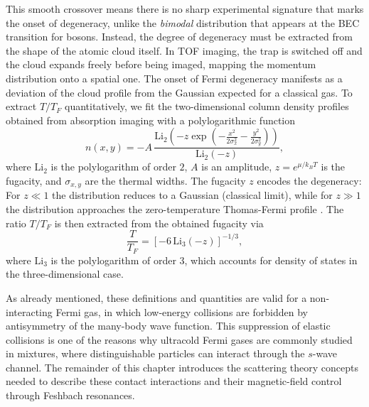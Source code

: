 This smooth crossover means there is no sharp experimental signature that marks the onset of degeneracy, unlike the \textit{bimodal} distribution that appears at the \ac{BEC} transition for bosons. Instead, the degree of degeneracy must be extracted from the shape of the atomic cloud itself. In \ac{TOF} imaging, the trap is switched off and the cloud expands freely before being imaged, mapping the momentum distribution onto a spatial one. The onset of Fermi degeneracy manifests as a deviation of the cloud profile from the Gaussian expected for a classical gas. To extract $T/T_F$ quantitatively, we fit the two-dimensional column density profiles obtained from absorption imaging with a polylogarithmic function \cite{Ketterle2008mpa, Demarco2001qbo}
\begin{equation}
	n(x,y) = -A\,\frac{\mathrm{Li}_2\left(-z \exp\left(-\frac{x^2}{2\sigma_x^2} - \frac{y^2}{2\sigma_y^2}\right)\right)}{\mathrm{Li}_2\left(-z\right)},
	\label{eq:PolyLog}
\end{equation} 
where $ \mathrm{Li}_2$ is the polylogarithm of order $2$, $A$ is an amplitude, $z=e^{\mu/k_BT}$ is the fugacity, and $\sigma_{x,y}$ are the thermal widths. The fugacity $z$ encodes the degeneracy: For $z\ll 1$ the distribution reduces to a Gaussian (classical limit), while for $z\gg1$ the distribution approaches the zero-temperature Thomas-Fermi profile \cite{Giorgini2008tou}. The ratio  $T/T_F$ is then extracted from the obtained fugacity via
\begin{equation}
	\frac{T}{T_F} = \left[-6\,\mathrm{Li}_3(-z)\right]^{-1/3},
\end{equation}
where $ \mathrm{Li}_3$ is the polylogarithm of order $3$, which accounts for density of states in the three-dimensional case.



As already mentioned, these definitions and quantities are valid for a non-interacting Fermi gas, in which low-energy collisions are forbidden by antisymmetry of the many-body wave function. This suppression of elastic collisions is one of the reasons why ultracold Fermi gases are commonly studied in mixtures, where distinguishable particles can interact through the $s$-wave channel. The remainder of this chapter introduces the scattering theory concepts needed to describe these contact interactions and their magnetic-field control through Feshbach resonances.



